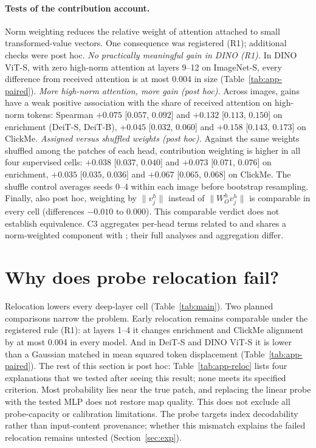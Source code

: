 \paragraph{Tests of the contribution account.} Norm weighting reduces the relative weight of attention attached to small transformed-value vectors. One consequence was registered (R1); additional checks were post hoc. \emph{No practically meaningful gain in DINO (R1).} In DINO ViT-S, with zero high-norm attention at layers 9--12 on ImageNet-S, every difference from received attention is at most 0.004 in size (Table~\ref{tab:app-paired}). \emph{More high-norm attention, more gain (post hoc).} Across images, gains have a weak positive association with the share of received attention on high-norm tokens: Spearman $+0.075$ [$0.057$, $0.092$] and $+0.132$ [$0.113$, $0.150$] on enrichment (DeiT-S, DeiT-B), $+0.045$ [$0.032$, $0.060$] and $+0.158$ [$0.143$, $0.173$] on ClickMe. \emph{Assigned versus shuffled weights (post hoc).} Against the same weights shuffled among the patches of each head, contribution weighting is higher in all four supervised cells: $+0.038$ [$0.037$, $0.040$] and $+0.073$ [$0.071$, $0.076$] on enrichment, $+0.035$ [$0.035$, $0.036$] and $+0.067$ [$0.065$, $0.068$] on ClickMe. The shuffle control averages seeds 0--4 within each image before bootstrap resampling. Finally, also post hoc, weighting by $\lVert v_j^h\rVert$ instead of $\lVert W_O^h v_j^h\rVert$ is comparable in every cell (differences $-0.010$ to $0.000$). This comparable verdict does not establish equivalence. C3 aggregates per-head terms related to \citet{kobayashi2020} and shares a norm-weighted component with \citet{zhu2024}; their full analyses and aggregation differ.

\section{Why does probe relocation fail?}
\label{app:reloc}

Relocation lowers every deep-layer cell (Table~\ref{tab:main}). Two planned comparisons narrow the problem. Early relocation remains comparable under the registered rule (R1): at layers 1--4 it changes enrichment and ClickMe alignment by at most 0.004 in every model. And in DeiT-S and DINO ViT-S it is lower than a Gaussian matched in mean squared token displacement (Table~\ref{tab:app-paired}). The rest of this section is post hoc: Table~\ref{tab:app-reloc} lists four explanations that we tested after seeing this result; none meets its specified criterion. Most probability lies near the true patch, and replacing the linear probe with the tested MLP does not restore map quality. This does not exclude all probe-capacity or calibration limitations. The probe targets index decodability rather than input-content provenance; whether this mismatch explains the failed relocation remains untested (Section~\ref{sec:exp}).

